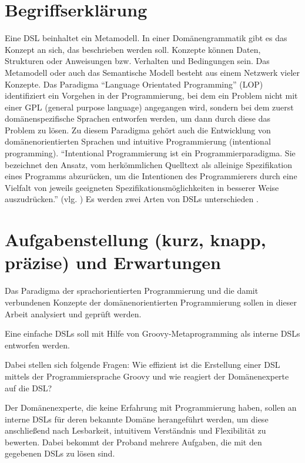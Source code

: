 \documentclass[11pt,english,ngerman, headsepline]{scrreprt}
\begin{document}
\section{Begriffserklärung}
Eine DSL beinhaltet ein Metamodell. In einer Domänengrammatik gibt es das
Konzept an sich, das beschrieben werden soll. Konzepte können Daten, Strukturen
oder Anweisungen bzw. Verhalten und Bedingungen sein. Das Metamodell oder auch
das Semantische Modell besteht aus einem Netzwerk vieler Konzepte. Das Paradigma
“Language Orientated Programming” (LOP) identifiziert ein Vorgehen in der
Programmierung, bei dem ein Problem nicht mit einer GPL (general purpose
language) angegangen wird, sondern bei dem zuerst domänenspezifische Sprachen
entworfen werden, um dann durch diese das Problem zu lösen. Zu diesem Paradigma
gehört auch die Entwicklung von domänenorientierten Sprachen und intuitive
Programmierung (intentional programming). “Intentional Programmierung ist ein
Programmierparadigma. Sie bezeichnet den Ansatz, vom herkömmlichen Quelltext als
alleinige Spezifikation eines Programms abzurücken, um die Intentionen des
Programmierers durch eine Vielfalt von jeweils geeigneten
Spezifikationsmöglichkeiten in besserer Weise auszudrücken.” (vlg.
\cite{wikiIntentional}) Es werden zwei Arten von DSLs unterschieden
\cite{fowler2011domain}. 


\section{Aufgabenstellung (kurz, knapp, präzise) und Erwartungen}

Das Paradigma der sprachorientierten Programmierung und die damit verbundenen
Konzepte der domänenorientierten Programmierung sollen in dieser Arbeit
analysiert und geprüft werden. 


Eine einfache DSLs soll mit Hilfe von
Groovy-Metaprogramming als interne DSLs entworfen werden.

Dabei stellen sich folgende Fragen: Wie effizient ist die Erstellung einer DSL
mittels der Programmiersprache Groovy und wie reagiert der Domänenexperte auf
die DSL?

Der Domänenexperte, die keine Erfahrung mit Programmierung haben, sollen an
interne DSLs für deren bekannte Domäne herangeführt werden, um diese
anschließend nach Lesbarkeit, intuitivem Verständnis und Flexibilität zu
bewerten. Dabei bekommt der Proband mehrere Aufgaben, die mit den
gegebenen DSLs zu lösen sind.
 
 
\end{document}
